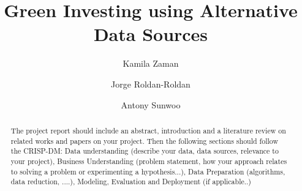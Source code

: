 \documentclass[sigconf, nonacm]{acmart}
\newcommand\vldbdoi{XX.XX/XXX.XX}
\newcommand\vldbpages{XXX-XXX}
\newcommand\vldbvolume{14}
\newcommand\vldbissue{1}
\newcommand\vldbyear{2020}
\newcommand\vldbauthors{\authors}
\newcommand\vldbtitle{\shorttitle}
\newcommand\vldbpagestyle{plain}
\begin{document}
\title{Green Investing using Alternative Data Sources}

\author{Kamila Zaman}

\author{Jorge Roldan-Roldan}

\author{Antony Sunwoo}


\begin{abstract}


The project report should include an abstract, introduction and a literature review on related works and papers on your project. Then the following sections should follow the CRISP-DM: Data understanding (describe your data, data sources, relevance to your project), Business Understanding (problem statement, how your approach relates to solving a problem or experimenting a hypothesis...), Data Preparation (algorithms, data reduction, ....), Modeling, Evaluation and Deployment (if applicable..) 


\end{abstract}

\maketitle


\end{document}
